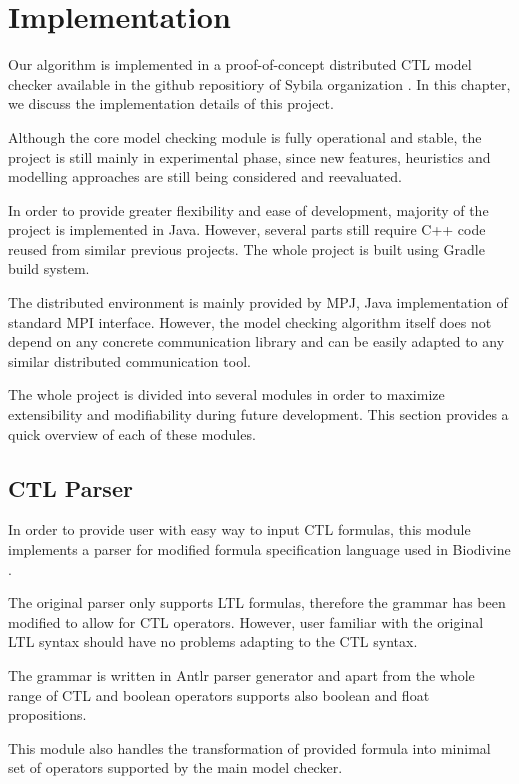 \documentclass[12pt,oneside, draft]{fithesis2}
\begin{document}
	\chapter{Implementation}

		Our algorithm is implemented in a proof-of-concept distributed CTL model checker available in the github repositiory of Sybila organization \cite{github}. In this chapter, we discuss the implementation details of this project. 
		
		Although the core model checking module is fully operational and stable, the project is still mainly in experimental phase, since new features, heuristics and modelling approaches are still being considered and reevaluated.
		
		In order to provide greater flexibility and ease of development, majority of the project is implemented in Java. However, several parts still require C++ code reused from similar previous projects. The whole project is built using Gradle build system.
			
		The distributed environment is mainly provided by MPJ, Java implementation of standard MPI interface. However, the model checking algorithm itself does not depend on any concrete communication library and can be easily adapted to any similar distributed communication tool.
			
		The whole project is divided into several modules in order to maximize extensibility and modifiability during future development. This section provides a quick overview of each of these modules.
			
		\section{CTL Parser}
			
			In order to provide user with easy way to input CTL formulas, this module implements a parser for modified formula specification language used in Biodivine \cite{biodivine}. 
				
			The original parser only supports LTL formulas, therefore the grammar has been modified to allow for CTL operators. However, user familiar with the original LTL syntax should have no problems adapting to the CTL syntax.
				
			The grammar is written in Antlr parser generator and apart from the whole range of CTL and boolean operators supports also boolean and float propositions.
				
			This module also handles the transformation of provided formula into minimal set of operators supported by the main model checker.
				
\end{document}
